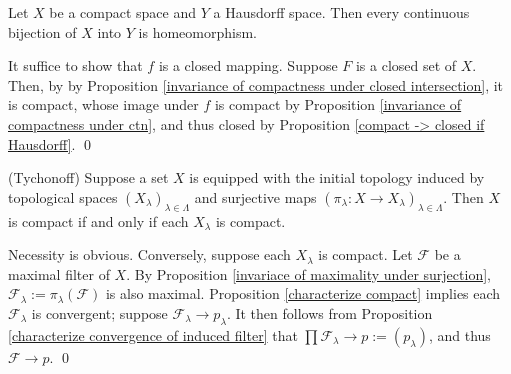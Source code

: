 \documentclass{report}
\begin{document}
\begin{prp}
    Let \( X \) be a compact space and \( Y \) a Hausdorff space.
    Then every continuous bijection of \( X \) into \( Y \) is homeomorphism.
\end{prp}
\begin{prf}
    It suffice to show that \( f \) is a closed mapping. Suppose \( F \) is a closed set of \( X \). Then, by by Proposition \ref{invariance of compactness under closed intersection}, it is compact, whose image under \( f \) is compact by Proposition \ref{invariance of compactness under ctn}, and thus closed by Proposition \ref{compact -> closed if Hausdorff}.
    \qed\end{prf}

\begin{thm} (Tychonoff)
    Suppose a set \( X \) is equipped with the initial topology induced by topological spaces \( (X_{\lambda})_{\lambda \in \Lambda} \) and surjective maps \( (\pi_{\lambda}: X \to X_{\lambda})_{\lambda \in \Lambda} \).
    Then \( X \) is compact if and only if each \( X_{\lambda} \) is compact.
\end{thm}
\begin{prf}
    Necessity is obvious. Conversely, suppose each \( X_{\lambda} \) is compact.
    Let \( \mathscr{F} \) be a maximal filter of \( X \). By Proposition \ref{invariace of maximality under surjection}, \( \mathscr{F}_{\lambda}:=\pi_{\lambda}(\mathscr{F}) \) is also maximal. Proposition \ref{characterize compact} implies each \( \mathscr{F}_{\lambda} \) is convergent; suppose \( \mathscr{F}_{\lambda}\to p_{\lambda} \). It then follows from Proposition \ref{characterize convergence of induced filter} that \( \prod \mathscr{F}_{\lambda} \to p:=(p_{\lambda})\), and thus \( \mathscr{F} \to p \).
    \qed\end{prf}
\end{document}
